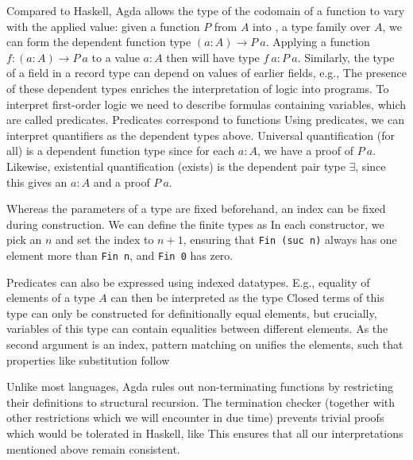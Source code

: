 Compared to Haskell, Agda allows the type of the codomain of a function to vary with the applied value:
given a function $P$ from $A$ into , a type family over $A$, we can form the dependent function type $(a : A) \to P\ a$. Applying a function $f: (a : A) \to P\ a$ to a value $a : A$ then will have type $f\ a : P\ a$. Similarly, the type of a field in a record type can depend on values of earlier fields, e.g.,
The presence of these dependent types enriches the interpretation of logic into programs. To interpret first-order logic we need to describe formulas containing variables, which are called predicates. Predicates correspond to functions%
Using predicates, we can interpret quantifiers as the dependent types above. Universal quantification (for all) is a dependent function type 
since for each $a : A$, we have a proof of $P\ a$. Likewise, existential quantification (exists) is the dependent pair type $\exists$, since this gives an $a : A$ and a proof $P\ a$. 

Whereas the parameters of a type are fixed beforehand, an index can be fixed during construction. We can define the finite types as
In each constructor, we pick an $n$ and set the index to $n+1$, ensuring that \texttt{Fin (suc n)} always has one element more than \texttt{Fin n}, and \texttt{Fin 0} has zero.

Predicates can also be expressed using indexed datatypes. E.g., equality of elements of a type $A$ can then be interpreted as the type
Closed terms of this type can only be constructed for definitionally equal elements, but crucially, variables of this type can contain equalities between different elements. As the second argument is an index, pattern matching on  unifies the elements, such that properties like substitution follow

Unlike most languages, Agda rules out non-terminating functions by restricting their definitions to structural recursion. The termination checker (together with other restrictions which we will encounter in due time) prevents trivial proofs which would be tolerated in Haskell, like
This ensures that all our interpretations mentioned above remain consistent.

\begin{comment}
With this, we can do maths. For example, we could define natural numbers as an inductive type
\[ \dots \]
and prove some properties of prime numbers. But to get the same results to binary numbers (without duplicating the proofs), we need a bit more. The usual notion of equalities of types are isomorphisms: two types $A, B$ are isomorphic if there are functions $A \to B$ and $B \to A$, which are mutually inverse 
\[ \dots \]
In ordinary Agda, we cannot directly apply these to transport along like we can for equalities, however.
\end{comment}


